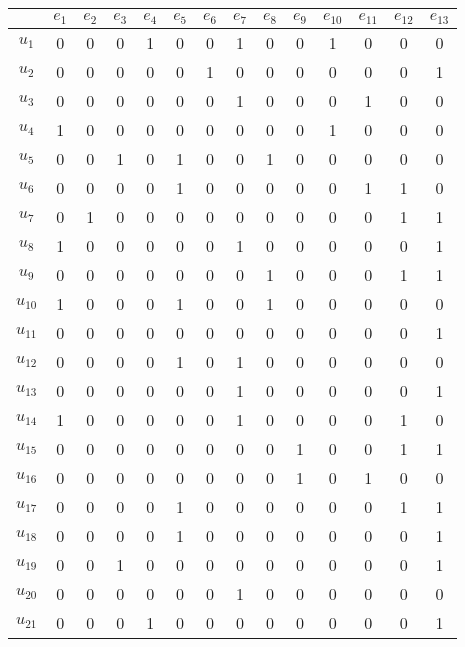\documentclass[12pt, a4paper] {ncc}
\begin{document}
\begin{longtable}{c|c c c c c c c c c c c c c}
\hline
      & $e_{1}$ & $e_{2}$ & $e_{3}$ & $e_{4}$ & $e_{5}$ & $e_{6}$ & $e_{7}$ & $e_{8}$ & $e_{9}$ & $e_{10}$ & $e_{11}$ & $e_{12}$ & $e_{13}$\\
\hline    %
$u_{1} $ & 0 & 0 & 0 & 1 & 0 & 0 & 1 & 0 & 0 & 1 & 0 & 0 & 0 \\
$u_{2} $ & 0 & 0 & 0 & 0 & 0 & 1 & 0 & 0 & 0 & 0 & 0 & 0 & 1 \\
$u_{3} $ & 0 & 0 & 0 & 0 & 0 & 0 & 1 & 0 & 0 & 0 & 1 & 0 & 0 \\
$u_{4} $ & 1 & 0 & 0 & 0 & 0 & 0 & 0 & 0 & 0 & 1 & 0 & 0 & 0 \\
$u_{5} $ & 0 & 0 & 1 & 0 & 1 & 0 & 0 & 1 & 0 & 0 & 0 & 0 & 0 \\
$u_{6} $ & 0 & 0 & 0 & 0 & 1 & 0 & 0 & 0 & 0 & 0 & 1 & 1 & 0 \\
$u_{7} $ & 0 & 1 & 0 & 0 & 0 & 0 & 0 & 0 & 0 & 0 & 0 & 1 & 1 \\
$u_{8} $ & 1 & 0 & 0 & 0 & 0 & 0 & 1 & 0 & 0 & 0 & 0 & 0 & 1 \\
$u_{9} $ & 0 & 0 & 0 & 0 & 0 & 0 & 0 & 1 & 0 & 0 & 0 & 1 & 1 \\
$u_{10}$ & 1 & 0 & 0 & 0 & 1 & 0 & 0 & 1 & 0 & 0 & 0 & 0 & 0 \\
$u_{11}$ & 0 & 0 & 0 & 0 & 0 & 0 & 0 & 0 & 0 & 0 & 0 & 0 & 1 \\
$u_{12}$ & 0 & 0 & 0 & 0 & 1 & 0 & 1 & 0 & 0 & 0 & 0 & 0 & 0 \\
$u_{13}$ & 0 & 0 & 0 & 0 & 0 & 0 & 1 & 0 & 0 & 0 & 0 & 0 & 1 \\
$u_{14}$ & 1 & 0 & 0 & 0 & 0 & 0 & 1 & 0 & 0 & 0 & 0 & 1 & 0 \\
$u_{15}$ & 0 & 0 & 0 & 0 & 0 & 0 & 0 & 0 & 1 & 0 & 0 & 1 & 1 \\
$u_{16}$ & 0 & 0 & 0 & 0 & 0 & 0 & 0 & 0 & 1 & 0 & 1 & 0 & 0 \\
$u_{17}$ & 0 & 0 & 0 & 0 & 1 & 0 & 0 & 0 & 0 & 0 & 0 & 1 & 1 \\
$u_{18}$ & 0 & 0 & 0 & 0 & 1 & 0 & 0 & 0 & 0 & 0 & 0 & 0 & 1 \\
$u_{19}$ & 0 & 0 & 1 & 0 & 0 & 0 & 0 & 0 & 0 & 0 & 0 & 0 & 1 \\
$u_{20}$ & 0 & 0 & 0 & 0 & 0 & 0 & 1 & 0 & 0 & 0 & 0 & 0 & 0 \\
$u_{21}$ & 0 & 0 & 0 & 1 & 0 & 0 & 0 & 0 & 0 & 0 & 0 & 0 & 1 \\
\end{longtable}
\end{document}
